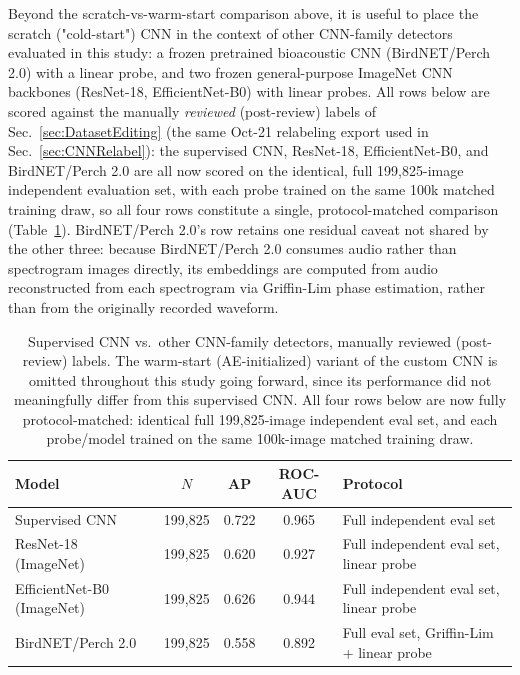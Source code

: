 \documentclass[preprint,NumberedRefs]{JASAnew}
\begin{document}
Beyond the scratch-vs-warm-start comparison above, it is useful to place the
scratch ("cold-start") CNN in the context of other CNN-family detectors
evaluated in this study: a frozen pretrained bioacoustic CNN (BirdNET/Perch
2.0) with a linear probe, and two frozen general-purpose ImageNet CNN
backbones (ResNet-18, EfficientNet-B0) with linear probes. All rows below are
scored against the manually \emph{reviewed} (post-review) labels of
Sec.~\ref{sec:DatasetEditing} (the same Oct-21 relabeling export used in
Sec.~\ref{sec:CNNRelabel}): the supervised CNN, ResNet-18, EfficientNet-B0,
and BirdNET/Perch 2.0 are all now scored on the identical, full
199,825-image independent evaluation set, with each probe trained on the
same 100k matched training draw, so all four rows constitute a single,
protocol-matched comparison (Table~\ref{tab:cnn_family_summary}). BirdNET/Perch
2.0's row retains one residual caveat not shared by the other three: because
BirdNET/Perch 2.0 consumes audio rather than spectrogram images directly,
its embeddings are computed from audio reconstructed from each spectrogram
via Griffin-Lim phase estimation, rather than from the originally recorded
waveform.

\begin{table}[ht]
    \centering
    \caption{Supervised CNN vs.\ other CNN-family detectors, manually
    reviewed (post-review) labels. The warm-start (AE-initialized) variant of
    the custom CNN is omitted throughout this study going forward, since its
    performance did not meaningfully differ from this supervised CNN. All
    four rows below are now fully protocol-matched: identical full
    199,825-image independent eval set, and each probe/model trained on the
    same 100k-image matched training draw.}
    \label{tab:cnn_family_summary}
    \begin{tabular}{|l|c|c|c|l|}
        \hline
        Model & $N$ & AP & ROC-AUC & Protocol \\
        \hline
        Supervised CNN             & 199{,}825 & 0.722 & 0.965 & Full independent eval set \\
        ResNet-18 (ImageNet)       & 199{,}825 & 0.620 & 0.927 & Full independent eval set, linear probe \\
        EfficientNet-B0 (ImageNet) & 199{,}825 & 0.626 & 0.944 & Full independent eval set, linear probe \\
        BirdNET/Perch 2.0          & 199{,}825 & 0.558 & 0.892 & Full eval set, Griffin-Lim + linear probe \\
        \hline
    \end{tabular}
\end{table}
\end{document}
